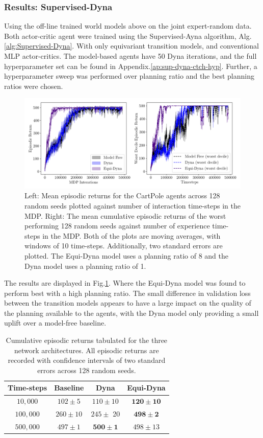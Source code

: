 \subsubsection{Results: Supervised-Dyna}
Using the off-line trained world models above on the joint expert-random data. Both actor-critic agent were trained using the Supervised-Ayna algorithm, Alg.\ref{alg:Supervised-Dyna}. With only equivariant transition models, and conventional MLP actor-critics. The model-based agents have 50 Dyna iterations, and the full hyperparameter set can be found in Appendix.\ref{ap:sup-dyna-ctch-hyp}. Further, a hyperparameter sweep was performed over planning ratio and the best planning ratios were chosen.
\begin{figure}
	\centering
	\includegraphics[width=\textwidth]{Figures/Expert_dyna_cp_best.png}
	\caption{Left: Mean episodic returns for the CartPole agents across 128 random seeds
		plotted against number of interaction time-steps in the MDP. Right: The mean
		cumulative episodic returns of the worst performing 128 random seeds against
		number of experience time-steps in the MDP. Both of the plots are moving
		averages, with windows of 10 time-steps. Additionally, two standard errors are
		plotted. The Equi-Dyna model uses a planning ratio of 8 and the Dyna model uses a planning ratio of 1.}
	\label{fig:sup-dyna-cp}
\end{figure}
The results are displayed in Fig.\ref{fig:sup-dyna-cp}. Where the Equi-Dyna model was found to perform best with a high planning ratio. The small difference in validation loss between the transition models appears to have a large impact on the quality of the planning available to the agents, with the Dyna model only providing a small uplift over a model-free baseline.
\begin{table}
	\centering
	\begin{tabular}{|c|c|c|c|}
		\hline
		Time-steps & Baseline     & Dyna                 & Equi-Dyna             \\
		\hline
		$10, 000$  & $102 \pm 5$  & $110 \pm 10$         & $\mathbf{120 \pm 10}$ \\
		$100, 000$ & $260 \pm 10$ & $245 \pm$ 20         & $\mathbf{498 \pm 2}$  \\
		$500,000$  & $497 \pm 1$  & $\mathbf{500 \pm 1}$ & $498 \pm 13$          \\
		\hline
	\end{tabular}
	\caption{Cumulative episodic returns tabulated for the three network architectures. All episodic returns are recorded with confidence intervals of two standard errors across 128 random seeds.}
	\label{tab:sup-dyna-cp}
\end{table}

